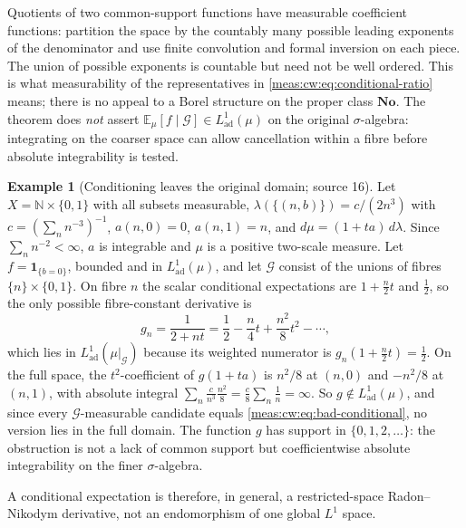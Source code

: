 \documentclass[11pt]{article}
\numberwithin{equation}{section}
\theoremstyle{definition}
\newtheorem{example}[theorem]{Example}
\theoremstyle{remark}
\newcommand{\N}{\mathbb N}
\newcommand{\No}{\mathbf{No}}
\newcommand{\E}{\mathbb E}
\newcommand{\ind}{\mathbf 1}
\newcommand{\Lad}{L^1_{\mathrm{ad}}}
\begin{document}
Quotients of two common-support functions have measurable coefficient
functions: partition the space by the countably many possible leading exponents
of the denominator and use finite convolution and formal inversion on each
piece. The union of possible exponents is countable but need not be well
ordered. This is what measurability of the representatives in
\eqref{meas:cw:eq:conditional-ratio} means; there is no appeal to a Borel
structure on the proper class $\No$. The theorem does \emph{not} assert
$\E_\mu[f\mid\mathcal G]\in\Lad(\mu)$ on the original $\sigma$-algebra: integrating
on the coarser space can allow cancellation within a fibre before absolute
integrability is tested.

\begin{example}[Conditioning leaves the original domain; source 16]
\label{meas:cw:ex:conditional-fail}
Let $X=\N\times\{0,1\}$ with all subsets measurable,
$\lambda(\{(n,b)\})=c/(2n^3)$ with $c=(\sum_nn^{-3})^{-1}$, $a(n,0)=0$, $a(n,1)=n$, and
$d\mu=(1+ta)\,d\lambda$. Since $\sum_nn^{-2}<\infty$, $a$ is integrable and $\mu$ is a
positive two-scale measure. Let $f=\ind_{\{b=0\}}$, bounded and in $\Lad(\mu)$, and
let $\mathcal G$ consist of the unions of fibres $\{n\}\times\{0,1\}$. On fibre $n$
the scalar conditional expectations are $1+\frac n2t$ and $\frac12$, so the only
possible fibre-constant derivative is
\begin{equation}\label{meas:cw:eq:bad-conditional}
 g_n=\frac1{2+nt}=\frac12-\frac n4t+\frac{n^2}8t^2-\cdots ,
\end{equation}
which lies in $\Lad(\mu|_{\mathcal G})$ because its weighted numerator is
$g_n(1+\frac n2t)=\frac12$. On the full space, the $t^2$-coefficient of
$g(1+ta)$ is $n^2/8$ at $(n,0)$ and $-n^2/8$ at $(n,1)$, with absolute integral
$\sum_n\frac c{n^3}\frac{n^2}8=\frac c8\sum_n\frac1n=\infty$. So $g\notin\Lad(\mu)$,
and since every $\mathcal G$-measurable candidate equals
\eqref{meas:cw:eq:bad-conditional}, no version lies in the full domain. The
function $g$ has support in $\{0,1,2,\ldots\}$: the obstruction is not a lack of
common support but coefficientwise absolute integrability on the finer
$\sigma$-algebra.
\end{example}

A conditional expectation is therefore, in general, a restricted-space
Radon--Nikodym derivative, not an endomorphism of one global $L^1$ space.
\end{document}
